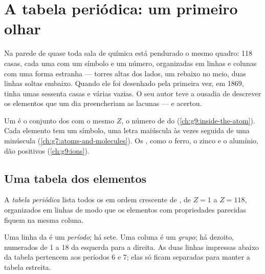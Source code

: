 \chapter{A tabela periódica: um primeiro olhar}\label{ch:g9:periodic-table-first-look}

Na parede de quase toda sala de química está pendurado o mesmo quadro:
118 casas, cada uma com um símbolo e um número, organizadas em linhas e
colunas com uma forma estranha --- torres altas dos lados, um rebaixo no
meio, duas linhas soltas embaixo. Quando ele foi desenhado pela primeira
vez, em 1869, tinha umas sessenta casas e várias vazias. O seu autor
teve a ousadia de descrever os elementos que um dia preencheriam as
lacunas --- e acertou.

\begin{recall}
Um  é o conjunto dos  com o mesmo 
$Z$, o número de  do  (\cref{ch:g9:inside-the-atom}). Cada
elemento tem um símbolo, uma letra maiúscula às vezes seguida de uma
minúscula (\cref{ch:g7:atoms-and-molecules}). Os , como o ferro, o
zinco e o alumínio, dão  positivos (\cref{ch:g9:ions}).
\end{recall}

\section{Uma tabela dos elementos}

\begin{definition}\label{def:g9:periodic-table-first-look:periodic-table}
A \emph{tabela periódica} lista todos os
 em ordem crescente de , de $Z = 1$ a
$Z = 118$, organizados em linhas de modo que os elementos com
propriedades parecidas fiquem na mesma coluna.
\end{definition}

\begin{definition}\label{def:g9:periodic-table-first-look:period}
Uma linha da  é um \emph{período}; há
sete. Uma coluna é um \emph{grupo}; há dezoito, numerados
de 1 a 18 da esquerda para a direita. As duas linhas impressas abaixo da
tabela pertencem aos períodos 6 e 7; elas só ficam separadas para manter
a tabela estreita.
\end{definition}

